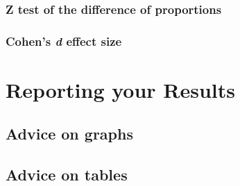\documentclass[
]{report}
\begin{document}
\hypertarget{z-test-of-the-difference-of-proportions}{%
\subsection{Z test of the difference of
proportions}\label{z-test-of-the-difference-of-proportions}}

\hypertarget{cohens-d-effect-size}{%
\subsection{\texorpdfstring{Cohen's \emph{d} effect
size}{Cohen's d effect size}}\label{cohens-d-effect-size}}

\hypertarget{reporting-your-results}{%
\chapter{Reporting your Results}\label{reporting-your-results}}

\hypertarget{advice-on-graphs}{%
\section{Advice on graphs}\label{advice-on-graphs}}

\hypertarget{advice-on-tables}{%
\section{Advice on tables}\label{advice-on-tables}}

  
\end{document}
